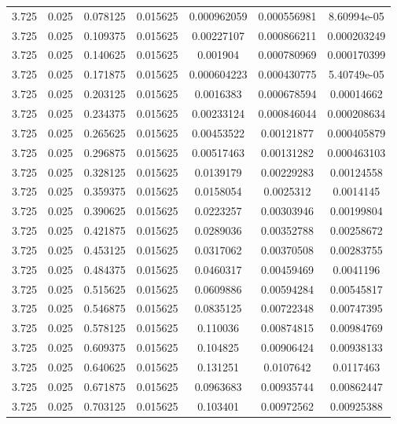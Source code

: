 \begin{table}[bh]
\begin{center}
{\begin{tabular}{ccccccc}
3.725	 & 0.025 & 	0.078125	 & 0.015625	 & 0.000962059	 & 0.000556981	 & 8.60994e-05 \\ 
3.725	 & 0.025 & 	0.109375	 & 0.015625	 & 0.00227107	 & 0.000866211	 & 0.000203249 \\ 
3.725	 & 0.025 & 	0.140625	 & 0.015625	 & 0.001904	 & 0.000780969	 & 0.000170399 \\ 
3.725	 & 0.025 & 	0.171875	 & 0.015625	 & 0.000604223	 & 0.000430775	 & 5.40749e-05 \\ 
3.725	 & 0.025 & 	0.203125	 & 0.015625	 & 0.0016383	 & 0.000678594	 & 0.00014662 \\ 
3.725	 & 0.025 & 	0.234375	 & 0.015625	 & 0.00233124	 & 0.000846044	 & 0.000208634 \\ 
3.725	 & 0.025 & 	0.265625	 & 0.015625	 & 0.00453522	 & 0.00121877	 & 0.000405879 \\ 
3.725	 & 0.025 & 	0.296875	 & 0.015625	 & 0.00517463	 & 0.00131282	 & 0.000463103 \\ 
3.725	 & 0.025 & 	0.328125	 & 0.015625	 & 0.0139179	 & 0.00229283	 & 0.00124558 \\ 
3.725	 & 0.025 & 	0.359375	 & 0.015625	 & 0.0158054	 & 0.0025312	 & 0.0014145 \\ 
3.725	 & 0.025 & 	0.390625	 & 0.015625	 & 0.0223257	 & 0.00303946	 & 0.00199804 \\ 
3.725	 & 0.025 & 	0.421875	 & 0.015625	 & 0.0289036	 & 0.00352788	 & 0.00258672 \\ 
3.725	 & 0.025 & 	0.453125	 & 0.015625	 & 0.0317062	 & 0.00370508	 & 0.00283755 \\ 
3.725	 & 0.025 & 	0.484375	 & 0.015625	 & 0.0460317	 & 0.00459469	 & 0.0041196 \\ 
3.725	 & 0.025 & 	0.515625	 & 0.015625	 & 0.0609886	 & 0.00594284	 & 0.00545817 \\ 
3.725	 & 0.025 & 	0.546875	 & 0.015625	 & 0.0835125	 & 0.00722348	 & 0.00747395 \\ 
3.725	 & 0.025 & 	0.578125	 & 0.015625	 & 0.110036	 & 0.00874815	 & 0.00984769 \\ 
3.725	 & 0.025 & 	0.609375	 & 0.015625	 & 0.104825	 & 0.00906424	 & 0.00938133 \\ 
3.725	 & 0.025 & 	0.640625	 & 0.015625	 & 0.131251	 & 0.0107642	 & 0.0117463 \\ 
3.725	 & 0.025 & 	0.671875	 & 0.015625	 & 0.0963683	 & 0.00935744	 & 0.00862447 \\ 
3.725	 & 0.025 & 	0.703125	 & 0.015625	 & 0.103401	 & 0.00972562	 & 0.00925388 \\ 

\end{tabular}}
\end{center}
\end{table}
